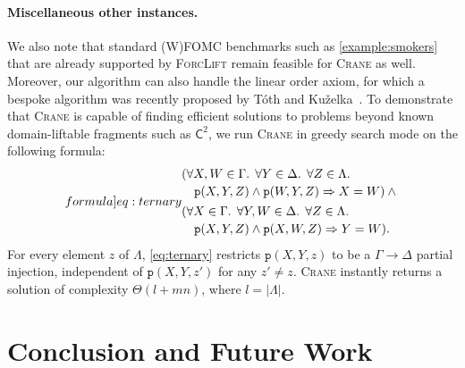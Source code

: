 \documentclass{article}
\theoremstyle{definition}
\theoremstyle{remark}
\newcommand{\Ctwo}{$\mathsf{C}^{2}$}
\begin{document}
\paragraph{Miscellaneous other instances.}
We also note that standard (W)FOMC benchmarks such as \cref{example:smokers}
that are already supported by \textsc{ForcLift} remain feasible for
\textsc{Crane} as well. Moreover, our algorithm can also handle the linear order
axiom, for which a bespoke algorithm was recently proposed by T{\'{o}}th and
Ku\v{z}elka~. To demonstrate that
\textsc{Crane} is capable of finding efficient solutions to problems beyond
known domain-liftable fragments such as \Ctwo{}, we run \textsc{Crane} in greedy
search mode on the following formula:
\begin{equation}\label[formula]{eq:ternary}
  \begin{split}
    &\begin{multlined}[t]
      (\forall X,W \in \Gamma\text{. }\forall Y \in \Delta\text{. }\forall Z \in \Lambda\text{. }\\
      \texttt{p}(X, Y, Z) \land \texttt{p}(W, Y, Z) \Rightarrow X = W) \land{}
    \end{multlined}\\
    &\begin{multlined}[t]
      (\forall X \in \Gamma\text{. }\forall Y,W \in \Delta\text{. }\forall Z \in \Lambda\text{. }\\
      \texttt{p}(X, Y, Z) \land \texttt{p}(X, W, Z) \Rightarrow Y = W).
    \end{multlined}
  \end{split}
\end{equation}
For every element $z$ of $\Lambda$, \cref{eq:ternary} restricts
$\texttt{p}(X, Y, z)$ to be a $\Gamma \to \Delta$ partial injection, independent
of $\texttt{p}(X, Y, z')$ for any $z' \ne z$. \textsc{Crane} instantly returns a
solution of complexity $\Theta(l+mn)$, where $l = |\Lambda|$.

\section{Conclusion and Future Work}\label{sec:conclusion}
\end{document}
